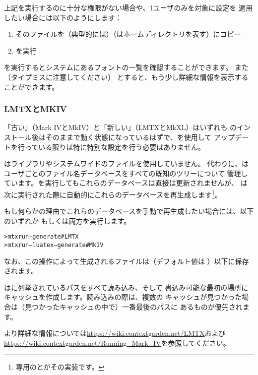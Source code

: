 \documentclass[uplatex,dvipdfmx,12pt]{jsarticle}
\begin{document}
上記を実行するのに十分な権限がない場合や、1ユーザのみを対象に設定を
適用したい場合には以下のようにします：
%
\begin{enumerate}
\item そのファイルを（典型的には）（\dir{~}はホームディレクトリを表す）にコピー
\item {}を実行
\end{enumerate}

を実行するとシステムにあるフォントの一覧を確認することができます。
また（タイプミスに注意してください）
とすると、もう少し詳細な情報を表示することができます。

\subsubsection{{\ConTeXt} LMTXとMKIV}
\label{sec:context}

「古い」\ConTeXt （Mark IVとMkIV）と「新しい」\ConTeXt （LMTXとMkXL）はいずれも
\TL のインストール後はそのままで動く状態になっているはずで、を使用して
アップデートを行っている限りは特に特別な設定を行う必要はありません。

\ConTeXt は\KPS ライブラリやシステムワイドのファイルを使用していません。
代わりに、\ConTeXt はユーザごとのファイル名データベースをすべての既知のツリーについて
管理しています。を実行してもこれらのデータベースは直接は更新されませんが、
\ConTeXt は次に実行された際に自動的にこれらのデータベースを再生成します\footnote{\TL
専用のとがその実装です。}。

もし何らかの理由でこれらのデータベースを手動で再生成したい場合には、以下のいずれか
もしくは両方を実行します。
%
\begin{alltt}
> mtxrun --generate           # LMTX
> mtxrun --luatex --generate  # MkIV
\end{alltt}

なお、この操作によって生成されるファイルは（デフォルト値は
）以下に保存されます。

\ConTeXt はに列挙されているパスをすべて読み込み、そして
書込み可能な最初の場所にキャッシュを作成します。読み込みの際は、複数の
キャッシュが見つかった場合は（見つかったキャッシュの中で）一番最後のパスに
あるものが優先されます。

より詳細な情報については\url{https://wiki.contextgarden.net/LMTX}および
\url{https://wiki.contextgarden.net/Running_Mark_IV}を参照してください。
\end{document}

